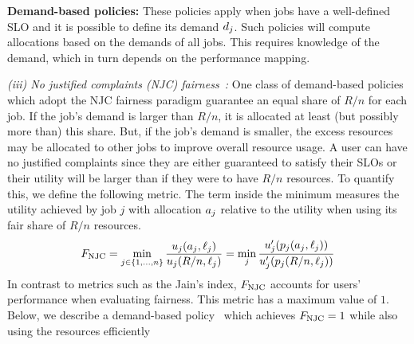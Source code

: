 
\textbf{Demand-based policies:}
These policies apply when jobs have a well-defined SLO and it is possible to define
its demand $d_{j}$.
Such policies will compute allocations based on the demands of all jobs.
This requires knowledge of the demand, which in turn
depends on the performance mapping.


\insertFigStrategyCompare

\emph{(iii) No justified complaints (NJC) fairness~\cite{demers1989analysis,dolev2012no,gutman2012fair}:}
One class of demand-based policies which adopt the NJC fairness paradigm
guarantee an equal share of $R/n$ for each job.
If the job's demand is larger than $R/n$, it is allocated at least (but possibly more
than) this share.
But, if the job's demand is smaller, the excess resources may
be allocated to other jobs to improve overall resource usage.
A user can have no justified complaints since they are either guaranteed to
satisfy their SLOs or their utility will be larger than if they were to have
$R/n$ resources.
To quantify this, we define the following metric.
The term inside the minimum measures the utility achieved by job $j$ with allocation
$a_{j}$ relative to the utility when using its fair share of $R/n$ resources.
\begin{align}
F_{\rm NJC} = \min_{j\in \{1,\dots,n\}}\frac{u_{j}(a_{j}, \ell_{j})}{u_{j}(R/n, \ell_{j})}
         = \min_{j}\frac{u'_{j}(p_{j}(a_{j}, \ell_{j}))}{u'_{j}(p_{j}(R/n, \ell_{j}))}
\label{eqn:njcfair}
\end{align}
In contrast to metrics such as the Jain's index\cite{jain1998fairness},
$F_{\rm NJC}$ accounts for users'
performance when evaluating fairness.
This metric has a maximum value of $1$.
Below, we describe a demand-based policy~\cite{demers1989analysis} which achieves
$F_{\rm NJC}=1$ while also using the resources efficiently 

